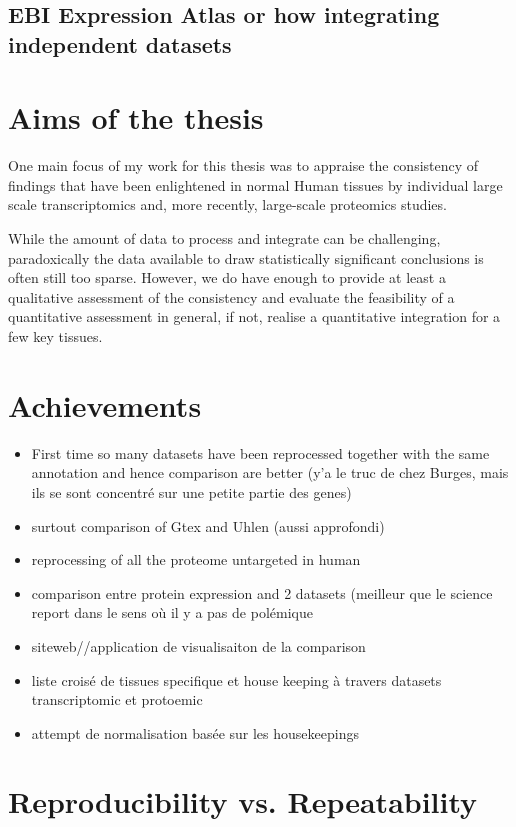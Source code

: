 \subsection{EBI Expression Atlas or how integrating independent datasets }


\section{Aims of the thesis}

One main focus of my work for this thesis was to appraise the
consistency of findings that have been enlightened in normal Human tissues by
individual large scale transcriptomics and, more recently, large-scale
proteomics studies.

While the amount of data to process and integrate can be challenging,
paradoxically the data available to draw statistically significant conclusions
is often still too sparse. However, we do have enough to provide at least a
qualitative assessment of the consistency and evaluate the feasibility of a
quantitative assessment in general, if not, realise a quantitative integration
for a few key tissues.

\section{Achievements}
\begin{itemize}
    \item First time so many datasets have been reprocessed together with the
        same annotation and hence comparison are better (y'a le truc de chez Burges,
        mais ils se sont concentré sur une petite partie des genes)
    \item surtout comparison of Gtex and Uhlen (aussi approfondi)
    \item reprocessing of all the proteome untargeted in human
    \item comparison entre protein expression and 2 datasets (meilleur que le
        science report dans le sens où il y a pas de polémique
    \item siteweb//application de visualisaiton de la comparison
    \item liste croisé de tissues specifique et house keeping à travers datasets
        transcriptomic et protoemic
    \item attempt de normalisation basée sur les housekeepings
\end{itemize}


\section{Reproducibility vs. Repeatability}

